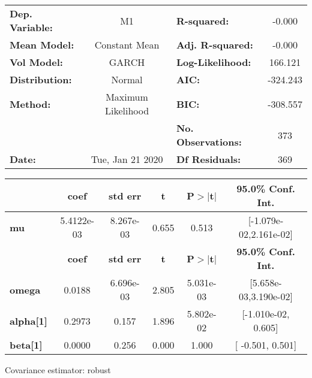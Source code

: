 \begin{center}
\begin{tabular}{lclc}
\toprule
\textbf{Dep. Variable:} &         M1         & \textbf{  R-squared:         } &    -0.000   \\
\textbf{Mean Model:}    &   Constant Mean    & \textbf{  Adj. R-squared:    } &    -0.000   \\
\textbf{Vol Model:}     &       GARCH        & \textbf{  Log-Likelihood:    } &    166.121  \\
\textbf{Distribution:}  &       Normal       & \textbf{  AIC:               } &   -324.243  \\
\textbf{Method:}        & Maximum Likelihood & \textbf{  BIC:               } &   -308.557  \\
\textbf{}               &                    & \textbf{  No. Observations:  } &    373      \\
\textbf{Date:}          &  Tue, Jan 21 2020  & \textbf{  Df Residuals:      } &    369      \\
\bottomrule
\end{tabular}
\begin{tabular}{lccccc}
            & \textbf{coef} & \textbf{std err} & \textbf{t} & \textbf{P$>$$|$t$|$} & \textbf{95.0\% Conf. Int.}  \\
\midrule
\textbf{mu} &   5.4122e-03  &    8.267e-03     &     0.655  &          0.513       &   [-1.079e-02,2.161e-02]    \\
                  & \textbf{coef} & \textbf{std err} & \textbf{t} & \textbf{P$>$$|$t$|$} & \textbf{95.0\% Conf. Int.}  \\
\midrule
\textbf{omega}    &       0.0188  &    6.696e-03     &     2.805  &      5.031e-03       &   [5.658e-03,3.190e-02]     \\
\textbf{alpha[1]} &       0.2973  &        0.157     &     1.896  &      5.802e-02       &    [-1.010e-02,  0.605]     \\
\textbf{beta[1]}  &     0.0000    &        0.256     &   0.000    &          1.000       &     [ -0.501,  0.501]       \\
\bottomrule
\end{tabular}
\end{center}

Covariance estimator: robust